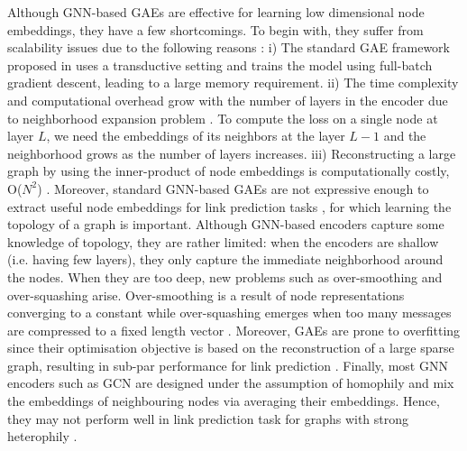 \documentclass{article}
\begin{document}
Although GNN-based GAEs \citep{kipf2016variational} are effective for learning low dimensional node embeddings, they have a few shortcomings. To begin with, they suffer from scalability issues due to the following reasons \citep{chiang2019cluster}: i) The standard GAE framework proposed in \citep{kipf2016variational} uses a transductive setting and trains the model using full-batch gradient descent, leading to a large memory requirement. ii) The time complexity and computational overhead grow with the number of layers in the encoder due to neighborhood expansion problem \citep{chiang2019cluster}. To compute the loss on a single node at layer $L$, we need the embeddings of its neighbors at the layer $L-1$ and the neighborhood grows as the number of layers increases. iii) Reconstructing a large graph by using the inner-product of node embeddings is computationally costly, O($N^2$) \citep{salha2021fastgae}. Moreover, standard GNN-based GAEs are not expressive enough to extract useful node embeddings for link prediction tasks \citep{pan2021neural, xu2018powerful, morris2019weisfeiler}, for which learning the topology of a graph is important. Although GNN-based encoders capture some knowledge of topology, they are rather limited: when the encoders are shallow (i.e. having few layers), they only capture the immediate neighborhood around the nodes. When they are too deep, new problems such as over-smoothing \cite{li2018deeper, chen2020measuring} and over-squashing \citep{alon2020bottleneck} arise. Over-smoothing is a result of node representations converging to a constant while over-squashing emerges when too many messages are compressed to a fixed length vector \citep{alon2020bottleneck}. Moreover, GAEs are prone to overfitting since their optimisation objective is based on the reconstruction of a large sparse graph, resulting in sub-par performance for link prediction \citep{Goyal_2018}. Finally, most GNN encoders such as GCN \citep{kipf2016semi} are designed under the assumption of homophily and mix the embeddings of neighbouring nodes via averaging their embeddings. Hence, they may not perform well in link prediction task for graphs with strong heterophily \citep{zhu2020beyond}.
\end{document}
